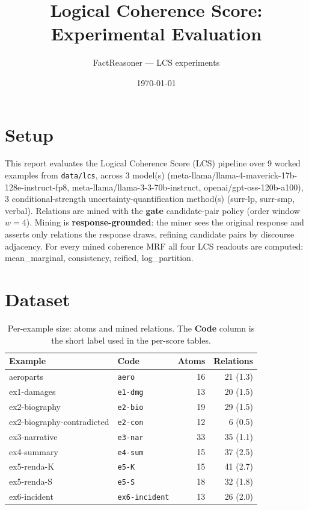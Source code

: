 \documentclass[11pt]{article}
\title{Logical Coherence Score: Experimental Evaluation}
\author{FactReasoner --- LCS experiments}
\date{\today}
\begin{document}
\maketitle

\section{Setup}

This report evaluates the Logical Coherence Score (LCS) pipeline over 9 worked examples from \texttt{data/lcs}, across 3 model(s) (meta-llama/llama-4-maverick-17b-128e-instruct-fp8, meta-llama/llama-3-3-70b-instruct, openai/gpt-oss-120b-a100), 3 conditional-strength uncertainty-quantification method(s) (surr-lp, surr-smp, verbal). Relations are mined with the \textbf{gate} candidate-pair policy (order window $w=4$). Mining is \textbf{response-grounded}: the miner sees the original response and asserts only relations the response draws, refining candidate pairs by discourse adjacency. For every mined coherence MRF all four LCS readouts are computed: mean\_marginal, consistency, reified, log\_partition. 

\section{Dataset}

\begin{table}[htbp]
\centering
\small
\caption{Per-example size: atoms and mined relations. The \textbf{Code} column is the short label used in the per-score tables.}
\label{tab:coverage}
\begin{tabular}{llrr}
\toprule
Example & Code & Atoms & Relations \\
\midrule
aeroparts & \texttt{aero} & 16 & 21 (1.3) \\
ex1-damages & \texttt{e1-dmg} & 13 & 20 (1.5) \\
ex2-biography & \texttt{e2-bio} & 19 & 29 (1.5) \\
ex2-biography-contradicted & \texttt{e2-con} & 12 & 6 (0.5) \\
ex3-narrative & \texttt{e3-nar} & 33 & 35 (1.1) \\
ex4-summary & \texttt{e4-sum} & 15 & 37 (2.5) \\
ex5-renda-K & \texttt{e5-K} & 15 & 41 (2.7) \\
ex5-renda-S & \texttt{e5-S} & 18 & 32 (1.8) \\
ex6-incident & \texttt{ex6-incident} & 13 & 26 (2.0) \\
\bottomrule
\end{tabular}
\end{table}
\end{document}
